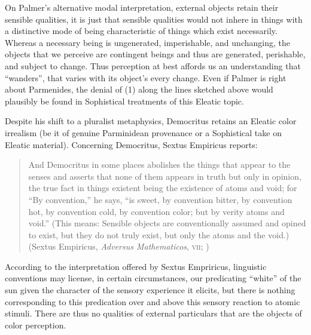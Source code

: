On Palmer's \citeyearpar{Palmer:2009qf} alternative modal interpretation, external objects retain their sensible qualities, it is just that sensible qualities would not inhere in things with a distinctive mode of being characteristic of things which exist necessarily. Whereas a necessary being is ungenerated, imperishable, and unchanging, the objects that we perceive are contingent beings and thus are generated, perishable, and subject to change. Thus perception at best affords us an understanding that ``wanders'', that varies with its object's every change. Even if Palmer is right about Parmenides, the denial of (1) along the lines sketched above would plausibly be found in Sophistical treatments of this Eleatic topic.

Despite his shift to a pluralist metaphysics, Democritus retains an Eleatic color irrealism (be it of genuine Parminidean provenance or a Sophistical take on Eleatic material). Concerning Democritus, Sextus Empiricus reports:
\begin{quote}
	And Democritus in some places abolishes the things that appear to the senses and asserts that none of them appears in truth but only in opinion, the true fact in things existent being the existence of atoms and void; for ``By convention,'' he says, ``is sweet, by convention bitter, by convention hot, by convention cold, by convention color; but by verity atoms and void.'' (This means: Sensible objects are conventionally assumed and opined to exist, but they do not truly exist, but only the atoms and the void.) (Sextus Empiricus, \emph{Adversus Mathematicos}, \textsc{vii}; \citealt[135--136]{Bury:1997uq})
\end{quote}
According to the interpretation offered by Sextus Empriricus, linguistic conventions may license, in certain circumstances, our predicating ``white'' of the sun given the character of the sensory experience it elicits, but there is nothing corresponding to this predication over and above this sensory reaction to atomic stimuli. There are thus no qualities of external particulars that are the objects of color perception. 

